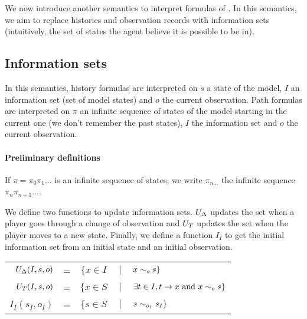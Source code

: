 We now introduce another semantics to interpret formulas of \ctlskd.
In this semantics, we aim to replace histories and observation records with information sets (intuitively, the set of states the agent believe it is possible to be in). 

\subsection{Information sets}
In this semantics, history formulas are interpreted on $s$ a state of the model, $I$ an information set (set of model states) and $o$ the current observation.
Path formulas are interpreted on $\pi$ an infinite sequence of states of the model starting in the current one (we don't remember the past states), $I$ the information set and $o$ the current observation.


\paragraph{Preliminary definitions}
If $\pi=\pi_0\pi_1\dots$ is an infinite sequence of states, we write $\pi_{n\dots}$ the infinite sequence $\pi_n\pi_{n+1}\dots$.

We define two functions to update information sets. $U_{\Delta}$ updates the set when a player goes through a change of observation and $U_T$ updates the set when the player moves to a new state. 
Finally, we define a function $I_I$ to get the initial information set from an initial state and an initial observation.

\begin{tabular}{r c c c l}
$U_{\Delta}(I,s,o)$& = &$\{x\in I$ & $~|~$ & $x\sim_{o}s\}$\\
$U_T(I,s,o)$& = &$\{x\in S$ & $~|~$ & $\exists t\in I, t\rightarrow x ~\text{and}~ x\sim_{o}s\}$\\
$I_I(s_I,o_I)$& = &$\{s\in S$ & $~|~$ & $s\sim_{o_I}s_I\}$\\
\end{tabular}


